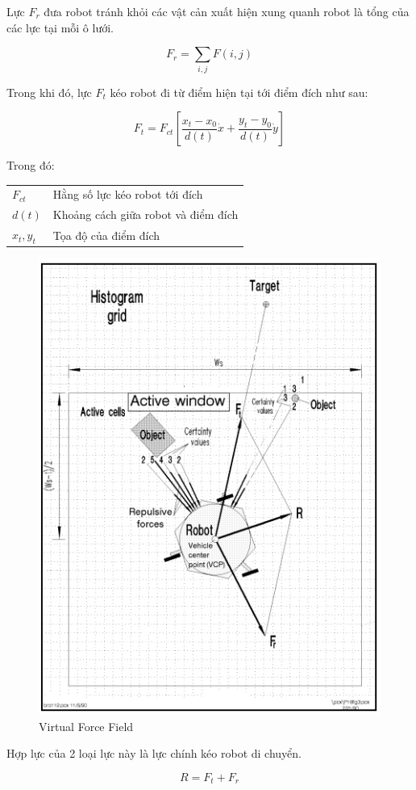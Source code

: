 Lực ${F}_{r}$ đưa robot tránh khỏi các vật cản xuất hiện xung quanh robot là tổng của các lực tại mỗi ô lưới.

\begin{equation}
  {F}_{r} = \sum\limits_{i,j}{F(i,j)}
\end{equation}

Trong khi đó, lực ${F}_{t}$ kéo robot đi từ điểm hiện tại tới điểm đích như sau:

\begin{equation}
  {F}_{t} = {F}_{ct} \left [\frac{{x}_{t}-{x}_{0}}{d(t)}\dot{x} + \frac{{y}_{t}-{y}_{0}}{d(t)}\dot{y}
  \right ]
\end{equation}

Trong đó:

\begin{tabular} {ll}
  ${F}_{ct}$    & Hằng số lực kéo robot tới đích \\
  $d(t)$        & Khoảng cách giữa robot và điểm đích \\
  ${x}_{t}, {y}_{t}$ & Tọa độ của điểm đích
\end{tabular}

\begin{figure}[htp]
  \centering
  \includegraphics[width=0.5\linewidth]{figures/VFFconcept.png}
  \caption{Virtual Force Field \cite{Koren1991}}
  \label{fig:VFFconcept}
\end{figure}

Hợp lực của 2 loại lực này là lực chính kéo robot di chuyển.

\begin{equation}
  R = {F}_{t} + {F}_{r}
\end{equation}


